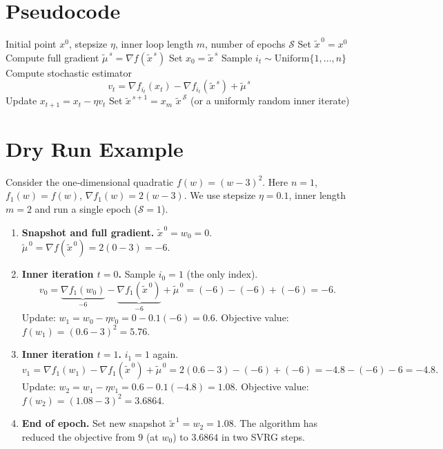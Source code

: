 \documentclass{article}
\begin{document}
\section*{Pseudocode}
\begin{algorithm}[H]
\caption{SVRG for non‑convex finite‑sum problems}
\label{alg:svrg}
\begin{algorithmic}[1]
\REQUIRE Initial point \(x^{0}\), stepsize \(\eta\), inner loop length \(m\), number of epochs \(\mathcal{S}\)
\STATE Set \(\tilde{x}^{\,0}=x^{0}\)
    \STATE Compute full gradient \(\tilde{\mu}^{\,s}= \nabla f(\tilde{x}^{\,s})\)   \hfill{}
    \STATE Set \(x_0=\tilde{x}^{\,s}\)
        \STATE Sample \(i_t\sim\text{Uniform}\{1,\dots,n\}\)
        \STATE Compute stochastic estimator 
        \[
        v_t = \nabla f_{i_t}(x_t)-\nabla f_{i_t}(\tilde{x}^{\,s})+\tilde{\mu}^{\,s}
        \]   \hfill{}
        \STATE Update \(x_{t+1}=x_t-\eta v_t\)                     \hfill{}
    \ENDFOR
    \STATE Set \(\tilde{x}^{\,s+1}=x_m\)
\ENDFOR
\RETURN \(\tilde{x}^{\,\mathcal{S}}\) (or a uniformly random inner iterate)
\end{algorithmic}
\end{algorithm}

\section*{Dry Run Example}
Consider the one‑dimensional quadratic \(f(w)=(w-3)^2\).  
Here \(n=1\), \(f_1(w)=f(w)\), \(\nabla f_1(w)=2(w-3)\).  
We use stepsize \(\eta=0.1\), inner length \(m=2\) and run a single epoch (\(\mathcal{S}=1\)).

\begin{enumerate}[label=Step \arabic*:, leftmargin=*, nosep]
\item \textbf{Snapshot and full gradient.}  
\(\tilde{x}^{\,0}=w_0=0\).  
\(\tilde{\mu}^{\,0}= \nabla f(\tilde{x}^{\,0}) = 2(0-3) = -6.\)

\item \textbf{Inner iteration \(t=0\).}  
Sample \(i_0=1\) (the only index).  
\[
v_0 = \underbrace{\nabla f_{1}(w_0)}_{-6}
      -\underbrace{\nabla f_{1}(\tilde{x}^{\,0})}_{-6}
      +\tilde{\mu}^{\,0}=(-6)-(-6)+(-6)=-6.
\]
Update:
\(w_1 = w_0 -\eta v_0 = 0 -0.1(-6)=0.6.\)  
Objective value: \(f(w_1)=(0.6-3)^2=5.76.\)

\item \textbf{Inner iteration \(t=1\).}  
\(i_1=1\) again.  
\[
v_1 = \nabla f_{1}(w_1)-\nabla f_{1}(\tilde{x}^{\,0})+\tilde{\mu}^{\,0}
     = 2(0.6-3)-(-6)+(-6)= -4.8-(-6)-6 = -4.8.
\]
Update:
\(w_2 = w_1 -\eta v_1 = 0.6 -0.1(-4.8)=1.08.\)  
Objective value: \(f(w_2)=(1.08-3)^2=3.6864.\)

\item \textbf{End of epoch.}  
Set new snapshot \(\tilde{x}^{\,1}=w_2=1.08\).  
The algorithm has reduced the objective from \(9\) (at \(w_0\)) to \(3.6864\) in two SVRG steps.
\end{enumerate}
\end{document}
